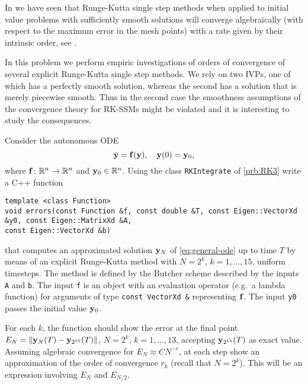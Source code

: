 \begin{problem}\label{prb:order-is-not-all} 
In  we have seen that Runge-Kutta single step methods when
applied to initial value problems with sufficiently smooth solutions will converge
algebraically (with respect to the maximum error in the mesh points) with a rate
given by their intrinsic order, see . 

In this problem we perform empiric investigations of orders of convergence of
several explicit Runge-Kutta single step methods. We rely on two IVPs, one of
which has a perfectly smooth solution, whereas the second has a solution that is
merely piecewise smooth. Thus in the second case the smoothness assumptions of the
convergence theory for RK-SSMs might be violated and it is interesting to study
the consequences. 

\begin{subproblem}[3]\label{sp:errors}
Consider the autonomous ODE
\begin{equation}
       \label{eq:general-ode}
	\dot{{\mathbf{y}}} = {\mathbf{f}}({\mathbf{y}}),\quad {\mathbf{y}}(0) = {\mathbf{y}}_0,
\end{equation}
where ${\mathbf{f}}\colon \mathbb{R}^n\to\mathbb{R}^n$ and ${\mathbf{y}}_0\in\mathbb{R}^n$. Using the class \texttt{RKIntegrate} of \ref{prb:RK3} write a C++ function
\begin{lstlisting}
template <class Function>
void errors(const Function &f, const double &T, const Eigen::VectorXd &y0, const Eigen::MatrixXd &A,
const Eigen::VectorXd &b)
\end{lstlisting}
that computes an approximated solution ${\mathbf{y}}_N$ of \eqref{eq:general-ode} up to
time $T$ by means of an explicit Runge-Kutta method with $N=2^k$, $k=1,\dots,15$,
uniform timesteps. The method is defined by the Butcher scheme described by the
inputs \texttt{A} and \texttt{b}. The input \texttt{f} is an object with an
evaluation operator (e.g.\ a lambda function) for arguments of type
\lstinline{const VectorXd &} representing ${\mathbf{f}}$. The input \texttt{y0} passes the
initial value ${\mathbf{y}}_0$.

For each $k$, the function should show the error at the final point
$E_N = \left\lVert  {\mathbf{y}}_N(T)-{\mathbf{y}}_{2^{15}}(T) \right\rVert$, $N=2^{k}$, $k=1,\ldots,13$, accepting
${\mathbf{y}}_{2^{15}}(T)$ as exact value. Assuming algebraic convergence for
$E_N\approx C N^{-r}$, at each step show an approximation of the order of
convergence $r_k$ (recall that $N=2^k$). This will be an expression involving
$E_N$ and $E_{N/2}$.


\end{subproblem}
\end{problem}

